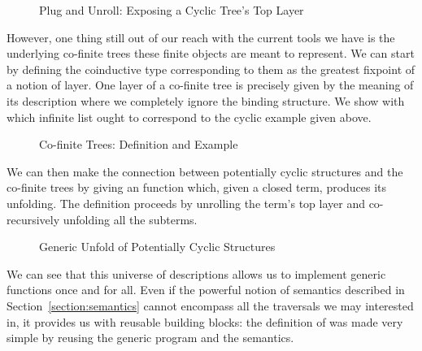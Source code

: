 \begin{figure}[h]
\begin{minipage}{0.52\textwidth}
\end{minipage}\hspace{2em}
\begin{minipage}{0.43\textwidth}
\end{minipage}
\caption{Plug and Unroll: Exposing a Cyclic Tree's Top Layer}
\end{figure}

However, one thing still out of our reach with the current tools we have
is the underlying co-finite trees these finite objects are meant
to represent. We can start by defining the coinductive type
corresponding to them as the greatest fixpoint of a notion of
layer. One layer of a co-finite tree is precisely given by the
meaning of its description where we completely ignore the binding
structure. We show with  which infinite list ought to
correspond to the cyclic example  given above.

\begin{figure}[h]
\begin{minipage}{0.55\textwidth}
\end{minipage}\hspace{2em}
\begin{minipage}{0.35\textwidth}
\end{minipage}
\caption{Co-finite Trees: Definition and Example}
\end{figure}

We can then make the connection between potentially cyclic
structures and the co-finite trees by giving an 
function which, given a closed term, produces its unfolding.
The definition proceeds by unrolling the term's top layer and
co-recursively unfolding all the subterms.

\begin{figure}[h]
\caption{Generic Unfold of Potentially Cyclic Structures}
\end{figure}

We can see that this universe of descriptions allows us to
implement generic functions once and for all. Even if the
powerful notion of semantics described in Section~\ref{section:semantics}
cannot encompass all the traversals we may interested in,
it provides us with reusable building blocks: the definition
of  was made very simple by reusing the generic
program  and the  semantics.












